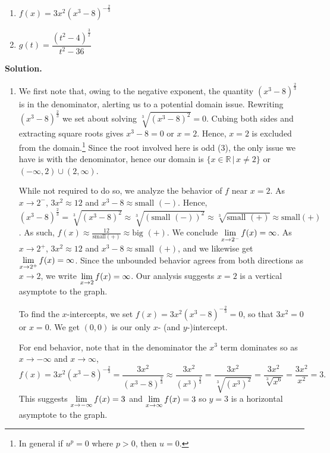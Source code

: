 \documentclass{ximera}
\begin{document}
\begin{ex}
\begin{multicols}{2}
\begin{enumerate}

\item  $f(x) = 3x^2(x^3-8)^{-\frac{2}{3}}$ 

\item  $g(t) = \dfrac{(t^2-4)^{\frac{3}{2}}}{t^2-36}$

\end{enumerate}
\end{multicols}

{\bf Solution.}

\begin{enumerate}

\item We first note that, owing to the negative exponent, the quantity $(x^3-8)^{\frac{2}{3}}$ is in the denominator, alerting us to a potential domain issue.  Rewriting $(x^3-8)^{\frac{2}{3}}$ we set about solving $\sqrt[3]{(x^3-8)^2} = 0$.  Cubing both sides and extracting square roots gives $x^3-8=0$ or $x =2$.   Hence, $x =2$ is excluded from the domain.\footnote{In general if $u^{p} = 0$ where $p>0$, then $u =0$.}   Since the root involved here is odd ($3$), the only issue we have is with the denominator, hence our domain is $\{ x \in \mathbb{R} \, | \, x \neq 2 \}$ or $(-\infty, 2) \cup (2, \infty)$.  

While not required to do so, we analyze the behavior of $f$ near $x = 2$.  As $x \rightarrow 2^{-}$, $3x^2 \approx 12$ and $x^3-8 \approx \text{small $(-)$}$.  Hence, $(x^3-8)^{\frac{2}{3}} =\sqrt[3]{(x^3-8)^2} \approx \sqrt[3]{(\text{small $(-)$})^2} \approx \sqrt[3]{\text{small $(+)$}} \approx \text{small$(+)$}$.  As such,  $f(x) \approx \frac{12}{ \text{small$(+)$}} \approx \text{big $(+)$}$.  We conclude $\ds{\lim_{x \rightarrow 2^{-}} f(x) = \infty}$. As $x \rightarrow 2^{+}$, $3x^2 \approx 12$ and $x^3 - 8 \approx \text{small $(+)$}$, and we likewise get $\ds{\lim_{x \rightarrow 2^{+}} f(x) = \infty}$.  Since the unbounded behavior agrees from both directions as $x \rightarrow 2$, we write $\ds{\lim_{x \rightarrow 2} f(x) = \infty}$.   Our analysis suggests $x=2$ is a vertical asymptote to the graph.


To find the $x$-intercepts, we set $f(x) =  3x^2(x^3-8)^{-\frac{2}{3}} = 0$, so that $3x^2 = 0$ or $x = 0$.  We get $(0,0)$ is our only $x$- (and $y$-)intercept.  

For end behavior, note that in the denominator the $x^3$ term dominates so as $x \rightarrow -\infty$ and $x \rightarrow \infty$, \[ f(x) = 3x^2(x^3-8)^{-\frac{2}{3}} = \dfrac{3x^2}{(x^3-8)^{\frac{2}{3}}} \approx \dfrac{3x^2}{ (x^3)^{ \frac{2}{3} } } = \dfrac{3x^2}{\sqrt[3]{(x^3)^2}} = \dfrac{3x^2}{\sqrt[3]{x^6}} = \dfrac{3x^2}{x^2} = 3.\]  This suggests $\ds{\lim_{x \rightarrow -\infty} f(x) = 3}$ and $\ds{\lim_{x \rightarrow \infty} f(x) = 3}$ so $y = 3$ is a horizontal asymptote to the graph.


\end{enumerate}
\end{ex}
\end{document}
